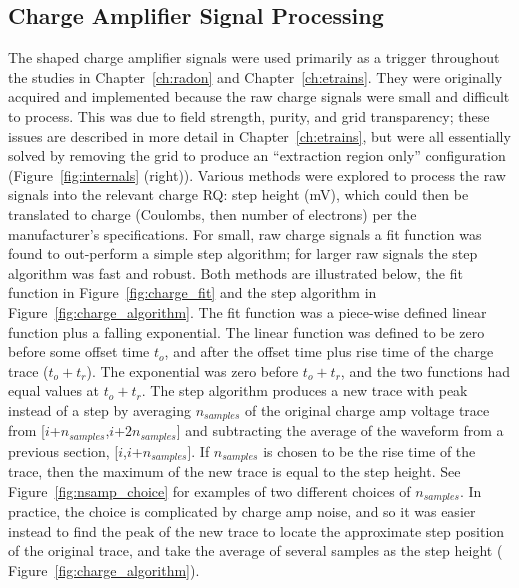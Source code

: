 \subsection{Charge Amplifier Signal Processing}
\label{sec:charge_amp_processing}
The shaped charge amplifier signals were used primarily as a trigger throughout the studies in Chapter~\ref{ch:radon} and Chapter~\ref{ch:etrains}. They were originally acquired and implemented because the raw charge signals were small and difficult to process. This was due to field strength, purity, and grid transparency; these issues are described in more detail in Chapter~\ref{ch:etrains}, but were all essentially solved by removing the grid to produce an ``extraction region only'' configuration (Figure~\ref{fig:internals} (right)). Various methods were explored to process the raw signals into the relevant charge \ac{RQ}: step height (mV), which could then be translated to charge (Coulombs, then number of electrons) per the manufacturer's specifications. For small, raw charge signals a fit function was found to out-perform a simple step algorithm; for larger raw signals the step algorithm was fast and robust. Both methods are illustrated below, the fit function in Figure~\ref{fig:charge_fit} and the step algorithm in Figure~\ref{fig:charge_algorithm}. The fit function was a piece-wise defined linear function plus a falling exponential. The linear function was defined to be zero before some offset time $t_{o}$, and after the offset time plus rise time of the charge trace ($t_{o} + t_{r}$). The exponential was zero before $t_{o} + t_{r}$, and the two functions had equal values at $t_{o} + t_{r}$. The step algorithm produces a new trace with peak instead of a step by averaging $n_{samples}$ of the original charge amp voltage trace from [$i$+$n_{samples}$,$i$+$2n_{samples}$] and subtracting the average of the waveform from a previous section, [$i$,$i$+$n_{samples}$]. If $n_{samples}$ is chosen to be the rise time of the trace, then the maximum of the new trace is equal to the step height. See Figure~\ref{fig:nsamp_choice} for examples of two different choices of $n_{samples}$. In practice, the choice is complicated by charge amp noise, and so it was easier instead to find the peak of the new trace to locate the approximate step position of the original trace, and take the average of several samples as the step height ( Figure~\ref{fig:charge_algorithm}).

